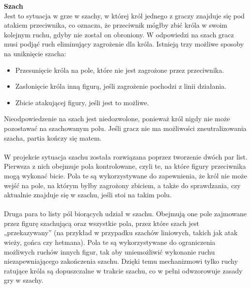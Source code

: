 \documentclass[12pt,a4paper]{article}
\begin{document}
\newpage

\noindent \textbf{Szach}\\
Jest to sytuacja w grze w szachy, w której król jednego z graczy znajduje się pod atakiem przeciwnika, co oznacza, że przeciwnik mógłby zbić króla w swoim kolejnym ruchu, gdyby nie został on obroniony. W odpowiedzi na szach gracz musi podjąć ruch eliminujący zagrożenie dla króla. Istnieją trzy możliwe sposoby na uniknięcie szacha:

\begin{itemize}
    \item Przesunięcie króla na pole, które nie jest zagrożone przez przeciwnika.
    \item Zasłonięcie króla inną figurą, jeśli zagrożenie pochodzi z linii działania.
    \item Zbicie atakującej figury, jeśli jest to możliwe.
\end{itemize}

\noindent
Nieodpowiedzenie na szach jest niedozwolone, ponieważ król nigdy nie może pozostawać na szachowanym polu. Jeśli gracz nie ma możliwości zneutralizowania szacha, partia kończy się matem.
\\\\
W projekcie sytuacja szachu została rozwiązana poprzez tworzenie dwóch par list. Pierwsza z nich obejmuje pola kontrolowane, czyli te, na które figury przeciwnika mogą wykonać bicie. Pola te są wykorzystywane do zapewnienia, że król nie może wejść na pole, na którym byłby zagrożony zbiciem, a także do sprawdzania, czy aktualnie znajduje się w szachu, jeśli stoi na takim polu.
\\\\
Druga para to listy pól biorących udział w szachu. Obejmują one pole zajmowane przez figurę szachującą oraz wszystkie pola, przez które szach jest „przekazywany” (na przykład w przypadku szachów liniowych, takich jak atak wieży, gońca czy hetmana). Pola te są wykorzystywane do ograniczenia możliwych ruchów innych figur, tak aby uniemożliwić wykonanie ruchu niezapewniającego zakończenia szachu. Dzięki temu mechanizmowi tylko ruchy ratujące króla są dopuszczalne w trakcie szachu, co w pełni odwzorowuje zasady gry w szachy.
\end{document}
